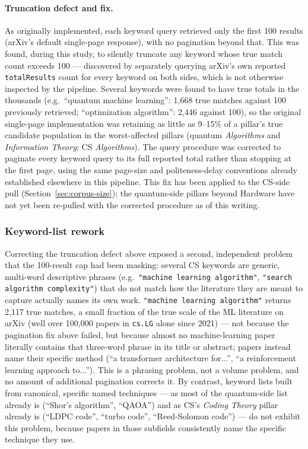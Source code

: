 \documentclass[11pt]{article}
\begin{document}
\paragraph{Truncation defect and fix.} As originally implemented, each keyword query
retrieved only the first 100 results (arXiv's default single-page response), with no
pagination beyond that. This was found, during this study, to silently truncate any
keyword whose true match count exceeds 100 --- discovered by separately querying
arXiv's own reported \texttt{totalResults} count for every keyword on both sides,
which is not otherwise inspected by the pipeline. Several keywords were found to have
true totals in the thousands (e.g.\ ``quantum machine learning'': 1{,}668 true matches
against 100 previously retrieved; ``optimization algorithm'': 2{,}446 against 100), so
the original single-page implementation was retaining as little as 9--15\% of a
pillar's true candidate population in the worst-affected pillars (quantum
\emph{Algorithms} and \emph{Information Theory}; CS \emph{Algorithms}). The query
procedure was corrected to paginate every keyword query to its full reported total
rather than stopping at the first page, using the same page-size and politeness-delay
conventions already established elsewhere in this pipeline. This fix has been applied
to the CS-side pull (Section~\ref{sec:corpus-size}); the quantum-side pillars beyond
Hardware have not yet been re-pulled with the corrected procedure as of this writing.

\subsubsection{Keyword-list rework}
\label{sec:keyword-rework}

Correcting the truncation defect above exposed a second, independent problem that the
100-result cap had been masking: several CS keywords are generic, multi-word
descriptive phrases (e.g.\ \texttt{"machine learning algorithm"},
\texttt{"search algorithm complexity"}) that do not match how the literature they are
meant to capture actually names its own work. \texttt{"machine learning algorithm"}
returns 2{,}117 true matches, a small fraction of the true scale of the ML literature
on arXiv (well over 100{,}000 papers in \texttt{cs.LG} alone since 2021) --- not
because the pagination fix above failed, but because almost no machine-learning paper
literally contains that three-word phrase in its title or abstract; papers instead name
their specific method (``a transformer architecture for...'', ``a reinforcement
learning approach to...''). This is a phrasing problem, not a volume problem, and no
amount of additional pagination corrects it. By contrast, keyword lists built from
canonical, specific named techniques --- as most of the quantum-side list already is
(``Shor's algorithm'', ``QAOA'') and as CS's \emph{Coding Theory} pillar already is
(``LDPC code'', ``turbo code'', ``Reed-Solomon code'') --- do not exhibit this problem,
because papers in those subfields consistently name the specific technique they use.
\end{document}
